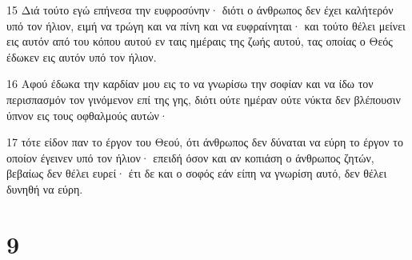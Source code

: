 \par 15 Διά τούτο εγώ επήνεσα την ευφροσύνην· διότι ο άνθρωπος δεν έχει καλήτερόν υπό τον ήλιον, ειμή να τρώγη και να πίνη και να ευφραίνηται· και τούτο θέλει μείνει εις αυτόν από του κόπου αυτού εν ταις ημέραις της ζωής αυτού, τας οποίας ο Θεός έδωκεν εις αυτόν υπό τον ήλιον.
\par 16 Αφού έδωκα την καρδίαν μου εις το να γνωρίσω την σοφίαν και να ίδω τον περισπασμόν τον γινόμενον επί της γης, διότι ούτε ημέραν ούτε νύκτα δεν βλέπουσιν ύπνον εις τους οφθαλμούς αυτών·
\par 17 τότε είδον παν το έργον του Θεού, ότι άνθρωπος δεν δύναται να εύρη το έργον το οποίον έγεινεν υπό τον ήλιον· επειδή όσον και αν κοπιάση ο άνθρωπος ζητών, βεβαίως δεν θέλει ευρεί· έτι δε και ο σοφός εάν είπη να γνωρίση αυτό, δεν θέλει δυνηθή να εύρη.

\chapter{9}

